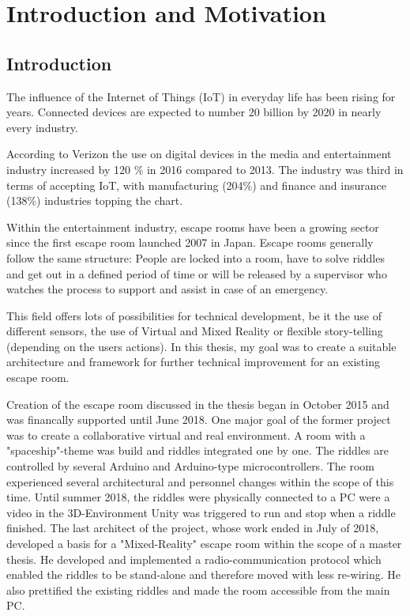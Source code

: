 
\chapter{Introduction and Motivation} %

\label{Chapter1} %


\section{Introduction}
The influence of the Internet of Things (IoT) in everyday life has been rising for years.
Connected devices are expected to number 20 billion \parencite{gartner0} by 2020 in nearly every industry.

According to Verizon \parencite{verizon} the use on digital devices in the media and entertainment industry increased by 120 \% in 2016 compared to 2013.
The industry was third in terms of accepting IoT,
with manufacturing (204\%) and finance and insurance (138\%) industries topping the chart.

Within the entertainment industry, escape rooms have been a growing sector since the first escape room launched 2007 in Japan.
Escape rooms generally follow the same structure: People are locked into a room, have to solve riddles
and get out in a defined period of time or will be released by a supervisor who watches the process to support
and assist in case of an emergency.

This field offers lots of possibilities for technical development, be it the use of different sensors, the use of Virtual and Mixed Reality or flexible story-telling (depending on the users actions).
In this thesis, my goal was to create a suitable architecture and framework for further technical improvement for an existing escape room.

Creation of the escape room discussed in the thesis began in October 2015 and was financally supported until June 2018.
One major goal of the former project was to create a collaborative virtual and real environment.
A room with a "spaceship"-theme was build and riddles integrated one by one.
The riddles are controlled by several Arduino and Arduino-type microcontrollers.
The room experienced several architectural and personnel changes within the scope of this time. 
Until summer 2018, the riddles were physically connected to a PC were a video in the 3D-Environment Unity was triggered to run and stop when a riddle finished.
The last architect of the project, whose work ended in July of 2018, developed a basis for a "Mixed-Reality" escape room within the scope of a master thesis.
He developed and implemented a radio-communication protocol which enabled the riddles to be stand-alone and therefore moved with less re-wiring.
He also prettified the existing riddles and made the room accessible from the main PC.


